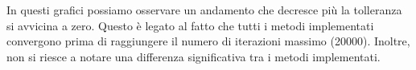 In questi grafici possiamo osservare un andamento che decresce più la tolleranza
si avvicina a zero. Questo è legato al fatto che tutti i metodi implementati
convergono prima di raggiungere il numero di iterazioni massimo (20000). Inoltre,
non si riesce a notare una differenza significativa tra i metodi implementati.

